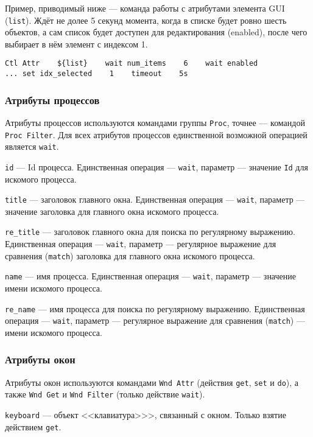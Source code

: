 \documentclass[11pt]{book} %
\begin{document}
Пример, приводимый ниже --- команда работы с атрибутами элемента GUI (\verb|list|). Ждёт не долее 5 секунд момента, когда в списке будет ровно шесть объектов, а сам список будет доступен для редактирования (enabled), после чего выбирает в нём элемент с индексом 1.
\begin{verbatim}
Ctl Attr    ${list}    wait num_items    6    wait enabled 
... set idx_selected    1    timeout    5s
\end{verbatim}


\subsubsection{Атрибуты процессов}

Атрибуты процессов используются командами группы \verb|Proc|, точнее --- командой \verb|Proc Filter|. Для всех атрибутов процессов единственной возможной операцией является \verb|wait|.

\verb|id| --- Id процесса. Единственная операция --- \verb|wait|, параметр --- значение \verb"Id" для искомого процесса.

\verb|title| --- заголовок главного окна. Единственная операция --- \verb|wait|, параметр --- значение заголовка для главного окна искомого процесса.

\verb|re_title| --- заголовок главного окна для поиска по регулярному выражению. Единственная операция --- \verb|wait|, параметр --- регулярное выражение для сравнения (\verb|match|) заголовка для главного окна искомого процесса.

\verb|name| --- имя процесса. Единственная операция --- \verb|wait|, параметр --- значение имени искомого процесса.

\verb|re_name| --- имя процесса для поиска по регулярному выражению. Единственная операция --- \verb|wait|, параметр --- регулярное выражение для сравнения (\verb|match|) --- имени искомого процесса.
		



\subsubsection{Атрибуты окон}

Атрибуты окон используются командами \verb"Wnd Attr" (действия \verb|get|, \verb|set| и \verb|do|), а также \verb|Wnd Get| и \verb|Wnd Filter| (только действие \verb|wait|).

\verb|keyboard| --- объект <<клавиатура>>>, связанный с окном. Только взятие действием \verb|get|.
\end{document}
